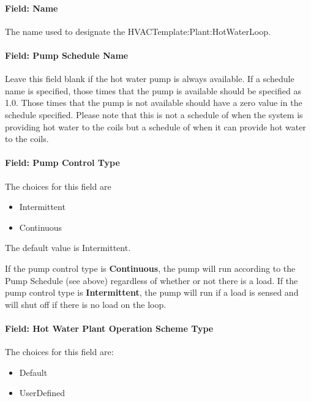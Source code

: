 \paragraph{Field: Name}\label{field-name-15-003}

The name used to designate the HVACTemplate:Plant:HotWaterLoop.

\paragraph{Field: Pump Schedule Name}\label{field-pump-schedule-name-1}

Leave this field blank if the hot water pump is always available. If a schedule name is specified, those times that the pump is available should be specified as 1.0. Those times that the pump is not available should have a zero value in the schedule specified. Please note that this is not a schedule of when the system is providing hot water to the coils but a schedule of when it can provide hot water to the coils.

\paragraph{Field: Pump Control Type}\label{field-pump-control-type-1}

The choices for this field are

\begin{itemize}
\item
  Intermittent
\item
  Continuous
\end{itemize}

The default value is Intermittent.

If the pump control type is \textbf{Continuous}, the pump will run according to the Pump Schedule (see above) regardless of whether or not there is a load. If the pump control type is \textbf{Intermittent}, the pump will run if a load is sensed and will shut off if there is no load on the loop.

\paragraph{Field: Hot Water Plant Operation Scheme Type}\label{field-hot-water-plant-operation-scheme-type}

The choices for this field are:

\begin{itemize}
\item
  Default
\item
  UserDefined
\end{itemize}

